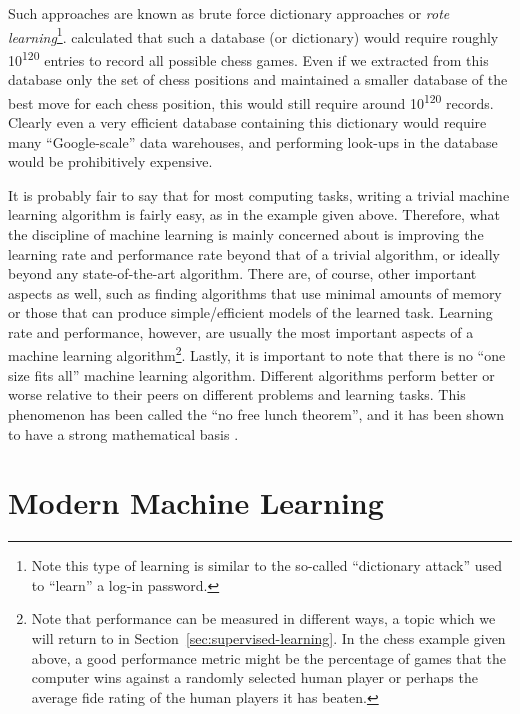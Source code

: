 Such approaches are known as brute force dictionary approaches or \emph{rote learning}\footnote{Note this type of learning is similar to the so-called ``dictionary attack'' used to ``learn'' a log-in password.}. \cite{shannon1950xxii} calculated that such a database (or dictionary) would require roughly 10\textsuperscript{120} entries to record all possible chess games. Even if we extracted from this database only the set of chess positions and maintained a smaller database of the best move for each chess position, this would still require around 10\textsuperscript{120} records. Clearly even a very efficient database containing this dictionary would require many ``Google-scale'' data warehouses, and performing look-ups in the database would be prohibitively expensive.  

It is probably fair to say that for most computing tasks, writing a trivial machine learning algorithm is fairly easy, as in the example given above. Therefore, what the discipline of machine learning is mainly concerned about is improving the learning rate and performance rate beyond that of a trivial algorithm, or ideally beyond any state-of-the-art algorithm. There are, of course, other important aspects as well, such as finding algorithms that use minimal amounts of memory or those that can produce simple/efficient models of the learned task. Learning rate and performance, however, are usually the most important aspects of a machine learning algorithm\footnote{Note that performance can be measured in different ways, a topic which we will return to in Section~\ref{sec:supervised-learning}. %
In the chess example given above, a good performance metric might be the percentage of games that the computer wins against a randomly selected human player or perhaps the average \gls{fide} rating of the human players it has beaten.}. Lastly, it is important to note that there is no ``one size fits all'' machine learning algorithm. Different algorithms perform better or worse relative to their peers on different problems and learning tasks. This phenomenon has been called the ``no free lunch theorem'', and it has been shown to have a strong mathematical basis \cite{wolpert1996lack}.

\section{Modern Machine Learning}
\label{sec:modern-machine-learning}


